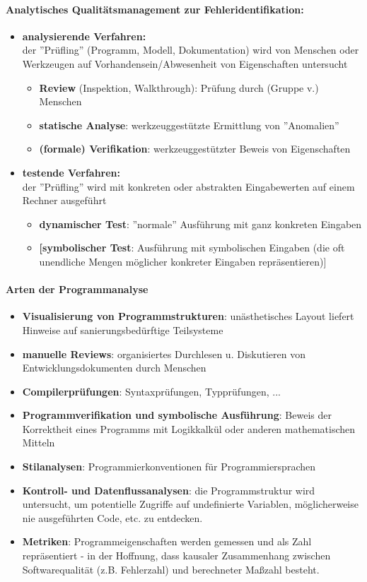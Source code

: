 \paragraph{Analytisches Qualitätsmanagement zur Fehleridentifikation:}
\begin{itemize}
	\item \textbf{analysierende Verfahren:} \\
	der ''Prüfling'' (Programm, Modell, Dokumentation) wird von Menschen oder Werkzeugen auf Vorhandensein/Abwesenheit von Eigenschaften untersucht
	\begin{itemize}
		\item \textbf{Review} (Inspektion, Walkthrough): Prüfung durch (Gruppe v.) Menschen
		\item \textbf{statische Analyse}: werkzeuggestützte Ermittlung von ''Anomalien''
		\item \textbf{(formale) Verifikation}: werkzeuggestützter Beweis von Eigenschaften 
	\end{itemize}
	\item \textbf{testende Verfahren:} \\
	der ''Prüfling'' wird mit konkreten oder abstrakten Eingabewerten auf einem Rechner ausgeführt
	\begin{itemize}
		\item \textbf{dynamischer Test}: ''normale'' Ausführung mit ganz konkreten Eingaben
		\item \textbf{[symbolischer Test}: Ausführung mit symbolischen Eingaben (die oft unendliche Mengen möglicher konkreter Eingaben repräsentieren)]
	\end{itemize}
\end{itemize}

\paragraph{Arten der Programmanalyse}
\begin{itemize}
	\item \textbf{Visualisierung von Programmstrukturen}: unästhetisches Layout liefert Hinweise auf sanierungsbedürftige Teilsysteme
	\item \textbf{manuelle Reviews}: organisiertes Durchlesen u. Diskutieren von Entwicklungsdokumenten durch Menschen
	\item \textbf{Compilerprüfungen}: Syntaxprüfungen, Typprüfungen, ...  
	\item \textbf{Programmverifikation und symbolische Ausführung}: Beweis der Korrektheit eines Programms mit Logikkalkül oder anderen mathematischen Mitteln
	\item \textbf{Stilanalysen}: Programmierkonventionen für Programmiersprachen
	\item \textbf{Kontroll- und Datenflussanalysen}: die Programmstruktur wird untersucht, um potentielle Zugriffe auf undefinierte Variablen, möglicherweise nie ausgeführten Code, etc. zu entdecken.
	\item \textbf{Metriken}: Programmeigenschaften werden gemessen und als Zahl repräsentiert - in der Hoffnung, dass kausaler Zusammenhang zwischen Softwarequalität (z.B. Fehlerzahl) und berechneter Maßzahl besteht.
\end{itemize}

